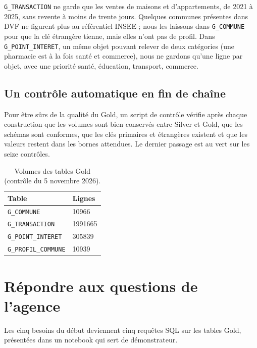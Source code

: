 \documentclass[11pt,a4paper]{article}
\begin{document}
\texttt{G\_TRANSACTION} ne garde que les ventes de maisons et d'appartements, de 2021 à 2025, sans revente à moins de trente jours. Quelques communes présentes dans DVF ne figurent plus au référentiel INSEE ; nous les laissons dans \texttt{G\_COMMUNE} pour que la clé étrangère tienne, mais elles n'ont pas de profil. Dans \texttt{G\_POINT\_INTERET}, un même objet pouvant relever de deux catégories (une pharmacie est à la fois santé et commerce), nous ne gardons qu'une ligne par objet, avec une priorité santé, éducation, transport, commerce.

\subsection{Un contrôle automatique en fin de chaîne}

Pour être sûrs de la qualité du Gold, un script de contrôle vérifie après chaque construction que les volumes sont bien conservés entre Silver et Gold, que les schémas sont conformes, que les clés primaires et étrangères existent et que les valeurs restent dans les bornes attendues. Le dernier passage est au vert sur les seize contrôles.

\begin{table}[H]
\centering
\caption{Volumes des tables Gold (contrôle du 5 novembre 2026).}
\begin{tabular}{@{}l R{3cm}@{}}
\toprule
Table & Lignes \\
\midrule
\texttt{G\_COMMUNE} & \num{10966} \\
\texttt{G\_TRANSACTION} & \num{1991665} \\
\texttt{G\_POINT\_INTERET} & \num{305839} \\
\texttt{G\_PROFIL\_COMMUNE} & \num{10939} \\
\bottomrule
\end{tabular}
\end{table}

\section{Répondre aux questions de l'agence}

Les cinq besoins du début deviennent cinq requêtes SQL sur les tables Gold, présentées dans un notebook qui sert de démonstrateur.
\end{document}
